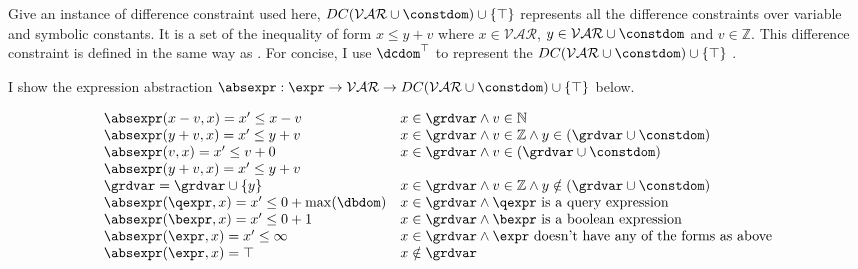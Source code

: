 Give an instance of difference constraint used here,
$DC(\mathcal{VAR}  \cup \constdom) \cup \{\top\}$ represents all the difference constraints over 
variable and symbolic constants. 
It is a set of the inequality of form $x \leq y + v$ where $x \in \mathcal{VAR} $, 
$y \in \mathcal{VAR}  \cup \constdom$ and $v \in \mathbb{Z}$. 
This difference constraint is defined in the same way as
\cite{SinnZV17}. For concise, I use $\dcdom^{\top}$ to represent the $DC(\mathcal{VAR}  \cup \constdom) \cup \{\top\}$ .


 I show the expression abstraction $\absexpr : \expr \to \mathcal{VAR} \to DC(\mathcal{VAR}  \cup \constdom) \cup \{\top\} $ below.

  \[
    \begin{array}{ll} 
      \absexpr(x - v, x)  = x' \leq x - v  & x \in \grdvar \land v \in \mathbb{N} \\
      \absexpr(y + v, x)  = x' \leq y + v  & x \in \grdvar \land v \in \mathbb{Z} \land y \in (\grdvar \cup \constdom) \\
      \absexpr(v, x)  = x' \leq v + 0  & x \in \grdvar \land v \in (\grdvar \cup \constdom) \\
      \absexpr(y + v, x)  = x' \leq y + v & \\
      \grdvar = \grdvar \cup \{y\} & x \in \grdvar \land v \in \mathbb{Z} \land y \notin (\grdvar \cup \constdom)  \\
      \absexpr(\qexpr, x)  = x' \leq 0 + \max(\dbdom) & x \in \grdvar \land \qexpr \text{ is a query expression}  \\
      \absexpr(\bexpr, x) = x' \leq 0 + 1   & x \in \grdvar \land \bexpr \text{ is a boolean expression} \\
      \absexpr(\expr, x) = x' \leq \infty  &  x \in \grdvar \land \expr \text{ doesn't have any of the forms as above} \\
      \absexpr(\expr, x) = \top  &  x \notin \grdvar \\
    \end{array}
    \]
  

